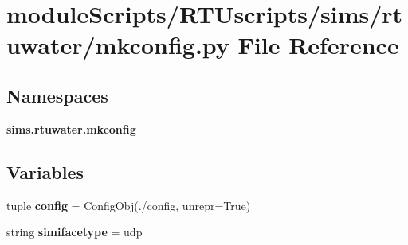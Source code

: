 \section{module\+Scripts/\+R\+T\+Uscripts/sims/rtuwater/mkconfig.py File Reference}
\label{rtuwater_2mkconfig_8py}
\subsection*{Namespaces}
\begin{DoxyCompactItemize}
\item 
 {\bf sims.\+rtuwater.\+mkconfig}
\end{DoxyCompactItemize}
\subsection*{Variables}
\begin{DoxyCompactItemize}
\item 
tuple {\bf config} = Config\+Obj(\textquotesingle{}./config\textquotesingle{}, unrepr=True)
\item 
string {\bf simifacetype} = \textquotesingle{}udp\textquotesingle{}
\end{DoxyCompactItemize}
